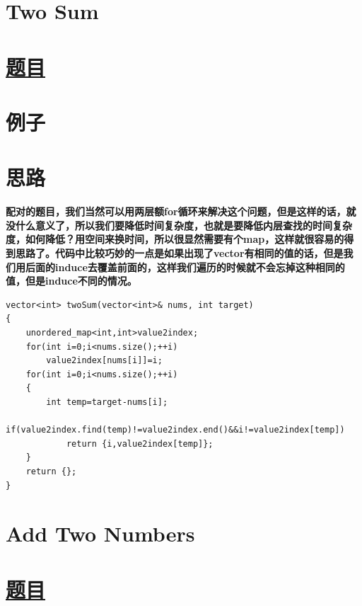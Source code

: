 \documentclass[a4paper, 11pt]{article} %
\begin{document}
\begin{spacing}{1.5}

\section{Two Sum}
\section*{\href{https://leetcode.com/problems/two-sum/}{题目}}
  \section*{例子}

\section*{思路}
\textbf{\color{blue}配对的题目，我们当然可以用两层额for循环来解决这个问题，但是这样的话，就没什么意义了，所以我们要降低时间复杂度，也就是要降低内层查找的时间复杂度，如何降低？用空间来换时间，所以很显然需要有个map，这样就很容易的得到思路了。代码中比较巧妙的一点是如果出现了vector有相同的值的话，但是我们用后面的induce去覆盖前面的，这样我们遍历的时候就不会忘掉这种相同的值，但是induce不同的情况。}
\begin{lstlisting}[caption={},frame=shadowbox]
vector<int> twoSum(vector<int>& nums, int target)
{
    unordered_map<int,int>value2index;
    for(int i=0;i<nums.size();++i)
        value2index[nums[i]]=i;
    for(int i=0;i<nums.size();++i)
    {
        int temp=target-nums[i];
        if(value2index.find(temp)!=value2index.end()&&i!=value2index[temp])
            return {i,value2index[temp]};
    }
    return {};
}   
\end{lstlisting}

\section{Add Two Numbers}
\section*{\href{https://leetcode.com/problems/add-two-numbers/}{题目} }
\fbox{%
  \parbox{\textwidth}{%

}}
\end{spacing}
\end{document}

